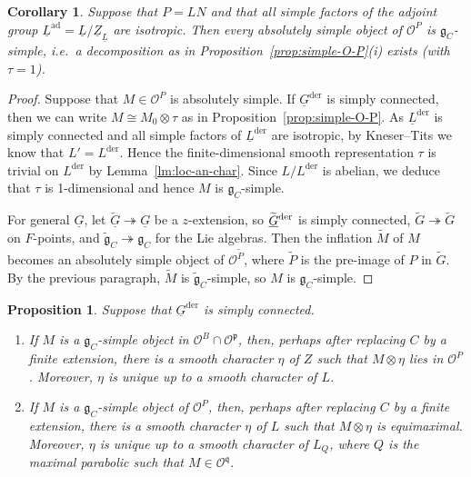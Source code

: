\documentclass[a4paper]{amsart}
\numberwithin{equation}{section}
\newtheorem{prop}[thm]{Proposition}
\newtheorem{cor}[thm]{Corollary}
\theoremstyle{remark}
\theoremstyle{definition}
\DeclareMathOperator{\ad}{ad}
\newcommand{\alggrp}[1]{\underline{#1}}
\newcommand{\der}{\mathrm{der}}
\newcommand{\onto}{\twoheadrightarrow}
\newcommand{\lowprime}[1][\prime]{
  \mathchoice
    {\raisebox{-0.7ex}{$\scriptstyle #1$}}
    {\raisebox{-0.7ex}{$\scriptstyle #1$}}
    {\raisebox{-0.7ex}{$\scriptstyle #1$}}
    {\raisebox{-0.3ex}{$\scriptscriptstyle #1$}}
}
\newcommand{\wt}[1]{\widetilde{#1}}
\begin{document}
\begin{cor}\label{cor:tau-trivial}
  Suppose that $P = LN$ and that all simple factors of the adjoint group $\alggrp{L}^{\ad} = \alggrp{L}/\alggrp{Z}_{\alggrp{L}}$ are isotropic.   Then every absolutely simple object of $\mathcal O^P$ is $\mathfrak{g}_{C}$-simple, i.e.\ a decomposition as in Proposition~\ref{prop:simple-O-P}(i) exists (with $\tau = 1$).
\end{cor}

\begin{proof}
  Suppose that $M \in \mathcal O^P$ is absolutely simple.
  If $\alggrp{G}^{\der}$ is simply connected, then we can write $M \cong M_0 \otimes \tau$ as in Proposition~\ref{prop:simple-O-P}.
  As $\alggrp{L}^{\der}$ is simply connected and all simple factors of $\alggrp{L}^{\der}$ are isotropic, by Kneser--Tits we know that $L' = L^\der$.   Hence the finite-dimensional smooth representation $\tau$ is trivial on $L^\der$ by Lemma~\ref{lm:loc-an-char}.
  Since $L/L^\der$ is abelian, we deduce that $\tau$ is 1-dimensional and hence $M$ is $\mathfrak{g}_C$-simple.

  For general $\alggrp{G}$, let $\wt{\alggrp G} \onto \alggrp G$ be a $z$-extension, so $\wt {\alggrp G}^{\lowprime[\der]}$ is simply connected, $\wt G \onto \wt G$ on $F$-points, and $\wt{\mathfrak g}_C \onto \mathfrak g_C$ for the Lie algebras.
  Then the inflation $\wt M$ of $M$ becomes an absolutely simple object of $\mathcal O^{\wt P}$, where $\wt P$ is the pre-image of $P$ in $\wt G$.
  By the previous paragraph, $\wt M$ is $\wt{\mathfrak g}_C$-simple, so $M$ is $\mathfrak{g}_C$-simple.
\end{proof}

\begin{prop}\label{prop:twist-to-O-P}  
  Suppose that $\alggrp{G}^{\der}$ is simply connected.
  \begin{enumerate}
  \item If $M$ is a $\mathfrak{g}_{C}$-simple object in $\mathcal{O}^{B} \cap \mathcal{O}^{\mathfrak{p}}$, then, perhaps after replacing $C$ by a finite extension, there
    is a smooth character $\eta$ of $Z$ such that $M \otimes \eta$ lies in $\mathcal{O}^{P}$.  Moreover, $\eta$ is unique up to a smooth
    character of $L$.
  \item 
    If $M$ is a $\mathfrak{g}_{C}$-simple object of $\mathcal{O}^{P}$, then, perhaps after replacing $C$ by a finite extension, there is a smooth character $\eta$ of $L$ such that $M \otimes \eta$ is
    equimaximal.  Moreover, $\eta$ is unique up to a smooth character of $L_Q$, where $Q$ is the maximal parabolic such that
    $M \in \mathcal{O}^{\mathfrak{q}}$.
  \end{enumerate}
\end{prop}
\end{document}
